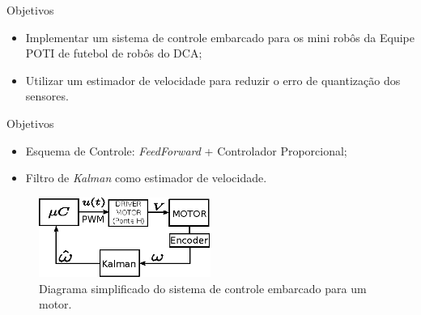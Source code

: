 \begin{frame}{Objetivos}
    \begin{itemize}
        \item Implementar um sistema de controle embarcado para os mini robôs da Equipe POTI de futebol de robôs do DCA;
        \item Utilizar um estimador de velocidade para reduzir o erro de quantização dos sensores.
    \end{itemize}
\end{frame}

\begin{frame}{Objetivos}

\begin{itemize}
    \item Esquema de Controle: \emph{FeedForward} + Controlador Proporcional;
    \item Filtro de \emph{Kalman} como estimador de velocidade.
\end{itemize}

\begin{figure}[H]
    \centering
    \includegraphics[width=0.5\textwidth]{figuras/ilustracoes/sistema_de_controle_embarcado.eps}
    \caption{Diagrama simplificado do sistema de controle embarcado para um motor.}
\end{figure}

\end{frame}